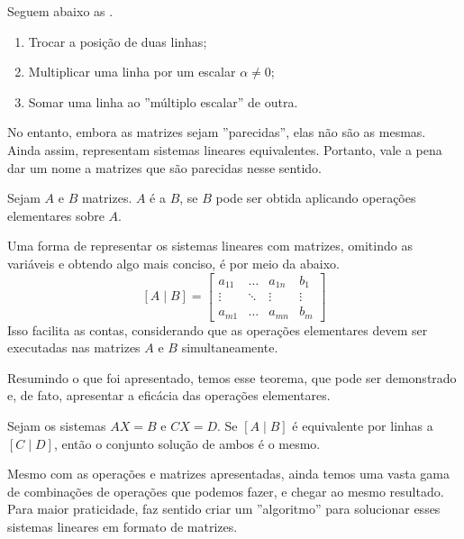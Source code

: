 \documentclass[../main.tex]{subfiles}
\begin{document}
			\begin{definicao}
				Seguem abaixo as .
				\begin{enumerate}
					\item Trocar a posição de duas linhas;
					\item Multiplicar uma linha por um escalar $\alpha\neq0$;
					\item Somar uma linha ao ''múltiplo escalar'' de outra.
				\end{enumerate}
			\end{definicao}
			
			No entanto, embora as matrizes sejam ''parecidas'', elas não são as mesmas. Ainda assim, representam sistemas lineares equivalentes. Portanto, vale a pena dar um nome a matrizes que são parecidas nesse sentido.  
			
			\begin{definicao}
				Sejam $A$ e $B$ matrizes. $A$ é  a $B$, se $B$ pode ser obtida aplicando operações elementares sobre $A$.
			\end{definicao}
			Uma forma de representar os sistemas lineares com matrizes, omitindo as variáveis e obtendo algo mais conciso, é por meio da  abaixo.
			\[
			[A \mid B] = \left[
			\begin{array}{ccc|c}
				a_{11} & \dots  & a_{1n} & b_1 \\
				\vdots & \ddots & \vdots & \vdots \\
				a_{m1} & \dots  & a_{mn} & b_m
			\end{array}
			\right]
			\]
			Isso facilita as contas, considerando que as operações elementares devem ser executadas nas matrizes $A$ e $B$ simultaneamente. 
			
			Resumindo o que foi apresentado, temos esse teorema, que pode ser demonstrado e, de fato, apresentar a eficácia das operações elementares.
			\begin{teorema}
				Sejam os sistemas $AX=B$ e $CX=D$. Se $[A \mid B]$ é equivalente por linhas a $[C \mid D]$, então o conjunto solução de ambos é o mesmo.
			\end{teorema}
			
			Mesmo com as operações e matrizes apresentadas, ainda temos uma vasta gama de combinações de operações que podemos fazer, e chegar ao mesmo resultado. Para maior praticidade, faz sentido criar um ''algoritmo'' para solucionar esses sistemas lineares em formato de matrizes.
			
\end{document}
